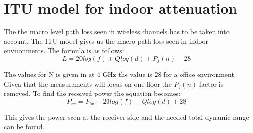 \section{ITU model for indoor attenuation}
The the macro level path loss seen in wireless channels has to be taken into account. The ITU model gives us the macro path loss seen in indoor environments. The formula is as follows:
\begin{equation}
L = 20log (f) + Q log (d) + P_f(n) - 28
\end{equation}

\begin{where}
\end{where}

The values for N is given in \citep{ITU_indoor} at 4 GHz the value is 28 for a office environment. Given that the measurements will focus on one floor the $P_f(n)$ factor is removed. To find the received power the equation becomes:
\begin{equation}
P_{rx} = P_{tx} - 20log(f) - Q log (d) +28
\end{equation}
\begin{where}
\end{where}
This gives the power seen at the receiver side and the needed  total dynamic range can be found.


